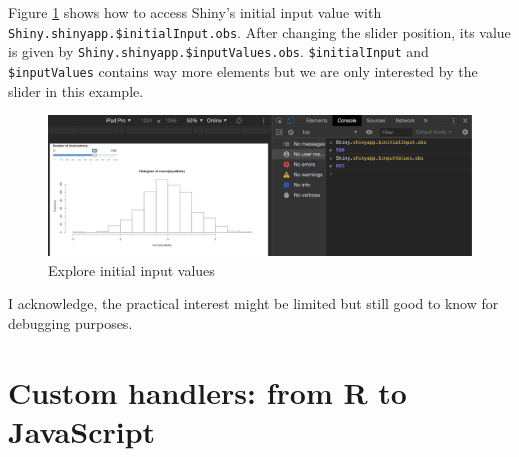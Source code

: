 \documentclass[]{book}
\newenvironment{Shaded}{\begin{snugshade}}{\end{snugshade}}
\newcommand{\ControlFlowTok}[1]{\textcolor[rgb]{0.13,0.29,0.53}{\textbf{#1}}}
\newcommand{\DataTypeTok}[1]{\textcolor[rgb]{0.13,0.29,0.53}{#1}}
\newcommand{\DecValTok}[1]{\textcolor[rgb]{0.00,0.00,0.81}{#1}}
\newcommand{\KeywordTok}[1]{\textcolor[rgb]{0.13,0.29,0.53}{\textbf{#1}}}
\newcommand{\NormalTok}[1]{#1}
\newcommand{\OperatorTok}[1]{\textcolor[rgb]{0.81,0.36,0.00}{\textbf{#1}}}
\newcommand{\StringTok}[1]{\textcolor[rgb]{0.31,0.60,0.02}{#1}}
\begin{document}
\begin{Shaded}
\end{Shaded}

Figure \ref{fig:shiny-initial-inputs} shows how to access Shiny's initial input value with \texttt{Shiny.shinyapp.\$initialInput.obs}. After changing the slider position, its value is given by \texttt{Shiny.shinyapp.\$inputValues.obs}. \texttt{\$initialInput} and \texttt{\$inputValues} contains way more elements but we are only interested by the slider in this example.

\begin{figure}
\includegraphics[width=27.61in]{images/survival-kit/shiny-init-input} \caption{Explore initial input values}\label{fig:shiny-initial-inputs}
\end{figure}

I acknowledge, the practical interest might be limited but still good to know for debugging purposes.

\hypertarget{custom-handlers-from-r-to-javascript}{%
\section{Custom handlers: from R to JavaScript}\label{custom-handlers-from-r-to-javascript}}
\end{document}
